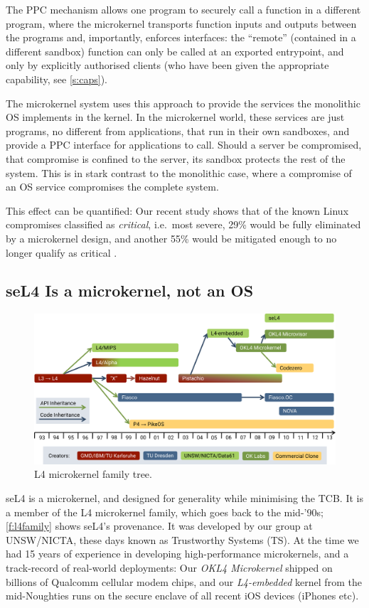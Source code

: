 \documentclass[english,a4paper,12pt]{report}
\newcommand{\SSect}[1]{\subsection{#1}}
\newcommand{\SSect}[1]{\section{#1}}
\begin{document}
  The PPC mechanism allows one program to securely call a function in a
  different program, where the microkernel transports function inputs
  and outputs between the programs and, importantly, enforces
  interfaces: the ``remote'' (contained in a different sandbox)
  function can only be called at an exported entrypoint, and only by
  explicitly authorised clients (who have been given the appropriate
  capability, see \autoref{s:caps}).

  The microkernel system uses this approach to provide the services
  the monolithic OS implements in the kernel. In the microkernel
  world, these services are just programs, no different from applications,
  that run in their own sandboxes, and provide a PPC interface for
  applications to call. Should a server be compromised, that compromise is
  confined to the server, its sandbox protects the rest of the
  system. This is in stark contrast to the monolithic case, where a
  compromise of an OS service compromises the complete system.

  This effect can be quantified: Our recent study shows that of the
  known Linux compromises classified as \emph{critical}, i.e.\ most
  severe, 29\% would be fully eliminated by a microkernel design, and
  another 55\% would be mitigated enough to no longer qualify as
  critical \citep{Biggs_LH_18}.

  \SSect{seL4 Is a microkernel, not an OS}


  \begin{figure}[ht]
    \centering
    \includegraphics{l4family}
    \caption{L4 microkernel family tree.}
    \label{f:l4family}
  \end{figure}

  seL4 is a microkernel, and designed for generality while
  minimising the TCB. It is a member of the L4
  microkernel family, which goes back to the mid-'90s;
  \autoref{f:l4family} shows seL4's provenance. It was developed by our group at UNSW/NICTA,
  these days known as Trustworthy Systems (TS). At the time we
  had 15 years of experience in developing
  high-performance microkernels, and a track-record of
  real-world deployments: Our \emph{OKL4 Microkernel} shipped on
  billions of Qualcomm cellular modem chips, and our \emph{L4-embedded} kernel from the
  mid-Noughties runs on the secure enclave of all recent
  iOS devices (iPhones etc).
\end{document}
